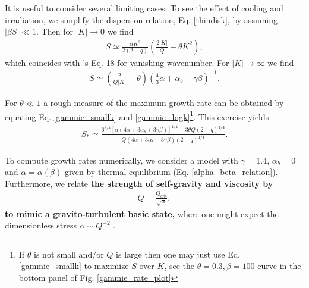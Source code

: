 It is useful to consider several limiting cases.
To see the effect of cooling and irradiation, we simplify the
dispersion relation, Eq. \ref{thindisk}, by assuming $|\beta S|\ll
1$. Then for $|K| \to 0$ we find
\begin{align}\label{gammie_smallk}
  S\simeq \frac{\alpha K^2}{2(2-q)}\left(\frac{2|K|}{Q} - \theta
  K^2\right), 
\end{align}
which coincides with \citeauthor{gammie96}'s Eq. 18 for vanishing
wavenumber. For $|K|\to\infty$ we find
\begin{align}\label{gammie_bigk}
  S \simeq\left(\frac{2}{Q|K|} - \theta\right)\left(\frac{4}{3}\alpha + 
  \alpha_b + \gamma\beta\right)^{-1}.
\end{align}

For $\theta\ll1$ a rough measure of the maximum growth rate can be obtained by
equating Eq. \ref{gammie_smallk} and \ref{gammie_bigk}\footnote{If
  $\theta$ is not small and/or $Q$  is large then one may just use Eq. \ref{gammie_smallk}
  to maximize $S$ over $K$, see the $\theta=0.3,\beta=100$ curve in the bottom
  panel of Fig. \ref{gammie_rate_plot}}.  
This exercise yields 
\begin{align}\label{gammie_maxrate_simple}
  S_*\simeq \frac{
    6^{3/4}\left[\alpha\left(4\alpha +
      3\alpha_b + 3\gamma\beta\right)\right]^{1/4} - 3\theta
    Q(2-q)^{1/4}}{Q\left(4\alpha + 3\alpha_b +
    3\gamma\beta\right)(2-q)^{1/4}}. 
\end{align} 


To compute growth rates numerically, 
we consider a model with $\gamma=1.4$, $\alpha_b=0$ and 
$\alpha=\alpha(\beta)$ given by thermal equilibrium
(Eq. \ref{alpha_beta_relation}). Furthermore, we relate
{\bf the strength of self-gravity and viscosity by}   
\begin{align} 
  Q = \frac{Q_\mathrm{crit}}{\sqrt{\alpha}},\label{Qalpha}
\end{align}
{\bf to mimic a gravito-turbulent basic state,} where one
might expect the dimensionless stress $\alpha \sim Q^{-2}$
\citep{lin87}.   

